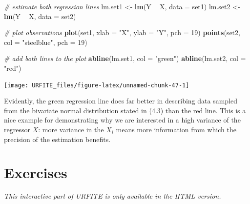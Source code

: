 \documentclass[]{book}
\newenvironment{Shaded}{\begin{snugshade}}{\end{snugshade}}
\newcommand{\KeywordTok}[1]{\textcolor[rgb]{0.13,0.29,0.53}{\textbf{#1}}}
\newcommand{\DataTypeTok}[1]{\textcolor[rgb]{0.13,0.29,0.53}{#1}}
\newcommand{\DecValTok}[1]{\textcolor[rgb]{0.00,0.00,0.81}{#1}}
\newcommand{\StringTok}[1]{\textcolor[rgb]{0.31,0.60,0.02}{#1}}
\newcommand{\CommentTok}[1]{\textcolor[rgb]{0.56,0.35,0.01}{\textit{#1}}}
\newcommand{\OperatorTok}[1]{\textcolor[rgb]{0.81,0.36,0.00}{\textbf{#1}}}
\newcommand{\NormalTok}[1]{#1}
\theoremstyle{definition}
\theoremstyle{definition}
\theoremstyle{definition}
\theoremstyle{remark}
\begin{document}
\begin{Shaded}
\begin{Highlighting}[]
\CommentTok{# estimate both regression lines}
\NormalTok{lm.set1 <-}\StringTok{ }\KeywordTok{lm}\NormalTok{(Y }\OperatorTok{~}\StringTok{ }\NormalTok{X, }\DataTypeTok{data =}\NormalTok{ set1)}
\NormalTok{lm.set2 <-}\StringTok{ }\KeywordTok{lm}\NormalTok{(Y }\OperatorTok{~}\StringTok{ }\NormalTok{X, }\DataTypeTok{data =}\NormalTok{ set2)}

\CommentTok{# plot observations}
\KeywordTok{plot}\NormalTok{(set1, }\DataTypeTok{xlab =} \StringTok{"X"}\NormalTok{, }\DataTypeTok{ylab =} \StringTok{"Y"}\NormalTok{, }\DataTypeTok{pch =} \DecValTok{19}\NormalTok{)}
\KeywordTok{points}\NormalTok{(set2, }\DataTypeTok{col =} \StringTok{"steelblue"}\NormalTok{, }\DataTypeTok{pch =} \DecValTok{19}\NormalTok{)}

\CommentTok{# add both lines to the plot}
\KeywordTok{abline}\NormalTok{(lm.set1, }\DataTypeTok{col =} \StringTok{"green"}\NormalTok{)}
\KeywordTok{abline}\NormalTok{(lm.set2, }\DataTypeTok{col =} \StringTok{"red"}\NormalTok{)}
\end{Highlighting}
\end{Shaded}

\begin{center}\texttt{[image: URFITE\_files/figure-latex/unnamed-chunk-47-1]} \end{center}

Evidently, the green regression line does far better in describing data
sampled from the bivariate normal distribution stated in (4.3) than the
red line. This is a nice example for demonstrating why we are interested
in a high variance of the regressor \(X\): more variance in the \(X_i\)
means more information from which the precision of the estimation
benefits.

\section{Exercises}\label{exercises}

\begin{center}\textit{This interactive part of URFITE is only available in the HTML version.}\end{center}


\end{document}
